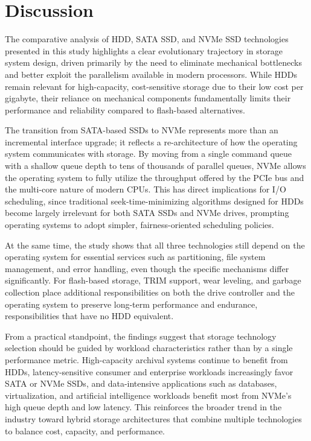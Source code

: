 \section{Discussion}
The comparative analysis of HDD, SATA SSD, and NVMe SSD technologies presented 
in this study highlights a clear evolutionary trajectory in storage system design, 
driven primarily by the need to eliminate mechanical bottlenecks and better exploit 
the parallelism available in modern processors. While HDDs remain relevant for high-capacity, 
cost-sensitive storage due to their low cost per gigabyte, their reliance on mechanical 
components fundamentally limits their performance and reliability compared to flash-based alternatives.

The transition from SATA-based SSDs to NVMe represents more than an incremental interface 
upgrade; it reflects a re-architecture of how the operating system communicates with storage. 
By moving from a single command queue with a shallow queue depth to tens of thousands of 
parallel queues, NVMe allows the operating system to fully utilize the throughput offered 
by the PCIe bus and the multi-core nature of modern CPUs. This has direct implications for 
I/O scheduling, since traditional seek-time-minimizing algorithms designed for HDDs become 
largely irrelevant for both SATA SSDs and NVMe drives, prompting operating systems to adopt 
simpler, fairness-oriented scheduling policies.

At the same time, the study shows that all three technologies still depend on the operating 
system for essential services such as partitioning, file system management, and error 
handling, even though the specific mechanisms differ significantly. For flash-based storage, 
TRIM support, wear leveling, and garbage collection place additional responsibilities on 
both the drive controller and the operating system to preserve long-term performance and 
endurance, responsibilities that have no HDD equivalent.

From a practical standpoint, the findings suggest that storage technology selection should 
be guided by workload characteristics rather than by a single performance metric. High-capacity 
archival systems continue to benefit from HDDs, latency-sensitive consumer and enterprise 
workloads increasingly favor SATA or NVMe SSDs, and data-intensive applications such as 
databases, virtualization, and artificial intelligence workloads benefit most from NVMe's 
high queue depth and low latency. This reinforces the broader trend in the industry toward 
hybrid storage architectures that combine multiple technologies to balance cost, capacity, 
and performance.

